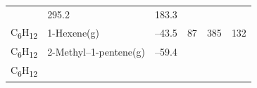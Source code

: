\documentclass[
  9pt,
]{extbook}
\theoremstyle{definition}
\theoremstyle{definition}
\theoremstyle{definition}
\theoremstyle{remark}
\begin{document}
\begin{longtable}[]{@{}llllll@{}}
\begin{minipage}[t]{0.15\columnwidth}
\strut
\end{minipage} & \begin{minipage}[t]{0.14\columnwidth}\raggedright
295.2\strut
\end{minipage} & \begin{minipage}[t]{0.14\columnwidth}\raggedright
183.3\strut
\end{minipage}\tabularnewline
\begin{minipage}[t]{0.07\columnwidth}\raggedright
C\textsubscript{6}H\textsubscript{12}\strut
\end{minipage} & \begin{minipage}[t]{0.17\columnwidth}\raggedright
1-Hexene(g)\strut
\end{minipage} & \begin{minipage}[t]{0.15\columnwidth}\raggedright
--43.5\strut
\end{minipage} & \begin{minipage}[t]{0.15\columnwidth}\raggedright
87\strut
\end{minipage} & \begin{minipage}[t]{0.14\columnwidth}\raggedright
385\strut
\end{minipage} & \begin{minipage}[t]{0.14\columnwidth}\raggedright
132\strut
\end{minipage}\tabularnewline
\begin{minipage}[t]{0.07\columnwidth}\raggedright
C\textsubscript{6}H\textsubscript{12}\strut
\end{minipage} & \begin{minipage}[t]{0.17\columnwidth}\raggedright
2-Methyl--1-pentene(g)\strut
\end{minipage} & \begin{minipage}[t]{0.15\columnwidth}\raggedright
--59.4\strut
\end{minipage} & \begin{minipage}[t]{0.15\columnwidth}\raggedright
\strut
\end{minipage} & \begin{minipage}[t]{0.14\columnwidth}\raggedright
\strut
\end{minipage} & \begin{minipage}[t]{0.14\columnwidth}\raggedright
\strut
\end{minipage}\tabularnewline
\begin{minipage}[t]{0.07\columnwidth}\raggedright
C\textsubscript{6}H\textsubscript{12}\strut
\end{minipage} & \begin{minipage}[t]{0.17\columnwidth}\raggedright

\end{minipage}
\end{longtable}
\end{document}
